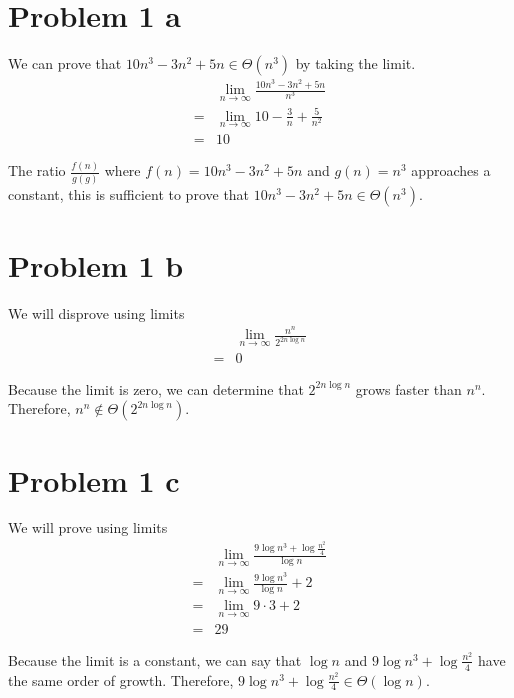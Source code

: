 \documentclass{article}
\newenvironment{problem}[1]{
  \nobreak\section*{Problem #1}
}{}
\newcommand*{\bigTheta}[1]{\ensuremath{\Theta\left(#1\right)}}
\begin{document}
  \begin{problem}{1 a}
    We can prove that $10n^3 - 3n^2 + 5n \in \bigTheta{n^3}$ by
    taking the limit.
    \begin{equation*}
      \begin{split}
        & \lim_{n \to \infty} \frac{10n^3 - 3n^2 + 5n}{n^3} \\
        = & \lim_{n \to \infty} 10 - \frac{3}{n} + \frac{5}{n^2} \\
        = & 10
      \end{split}
    \end{equation*}

    The ratio $\frac{f(n)}{g(g)}$ where $f(n) = 10n^3 - 3n^2 + 5n$
    and $g(n) = n^3$ approaches a constant, this is sufficient to
    prove that $10n^3 - 3n^2 + 5n \in \bigTheta{n^3}$.
  \end{problem}

  \begin{problem}{1 b}
    We will disprove using limits
    \begin{equation*}
      \begin{split}
        & \lim_{n \to \infty} \frac{n^n}{2^{2n\log{n}}} \\
        = & 0
      \end{split}
    \end{equation*}

    Because the limit is zero, we can determine that $2^{2n\log{n}}$ grows
    faster than $n^n$.  Therefore, $n^n \notin \bigTheta{2^{2n\log{n}}}$.
  \end{problem}

  \begin{problem}{1 c}
    We will prove using limits
    \begin{equation*}
      \begin{split}
        & \lim_{n \to \infty} \frac{9\log{n^3} + \log{\frac{n^2}{4}}}{\log{n}} \\
        = & \lim_{n \to \infty} \frac{9\log{n^3}}{\log{n}} + 2 \\
        = & \lim_{n \to \infty} 9 \cdot 3 + 2 \\
        = & 29
      \end{split}
    \end{equation*}

    Because the limit is a constant, we can say that $\log{n}$ and
    $9\log{n^3} + \log{\frac{n^2}{4}}$ have the same order of growth.
    Therefore, $9\log{n^3} + \log{\frac{n^2}{4}} \in \bigTheta{\log{n}}$.
  \end{problem}
\end{document}

